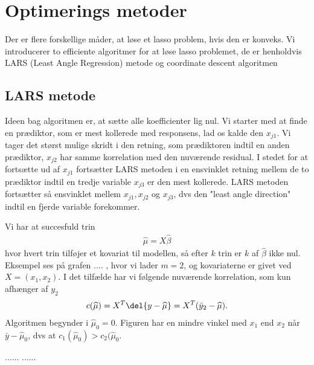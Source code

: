 \chapter{Optimerings metoder}

Der er flere forskellige måder, at løse et lasso problem, hvis den er konveks. 
Vi introducerer to efficiente algoritmer for at løse lasso problemet, de er henholdvis LARS  (Least Angle Regression) metode og coordinate descent algoritmen 

\section{LARS metode}
Ideen bag algoritmen er, at sætte alle koefficienter lig nul. 
Vi starter med at finde en prædiktor, som er mest kollerede med responsens, lad os kalde den $x_{j1}$. Vi tager det størst mulige skridt i den retning, som prædiktoren indtil en anden prædiktor, $x_{j2}$ har samme korrelation med den nuværende residual. 
I stedet for at fortsætte ud af $x_{j1}$ fortsætter LARS metoden i en ensvinklet retning mellem de to prædiktor indtil en tredje variable $x_{j3}$ er den mest kollerede. LARS metoden fortsætter så ensvinklet mellem $x_{j1}, x_{j2}$ og $ x_{j3}$, dvs den "least angle direction" indtil en fjerde variable forekommer. 

Vi har at succesfuld trin
\begin{align*}
\widehat{\mu} = X \widehat{\beta}
\end{align*}
hvor hvert trin tilføjer et kovariat til modellen, så efter $k$ trin er $k$ af $\widehat{\beta}$ ikke nul. 
Eksempel ses på grafen .... , hvor vi lader $m = 2$, og kovariaterne er givet ved $X = (x_1, x_2)$. I det tilfælde har vi følgende nuværende korrelation, som kun afhænger af $y_2$
\begin{align*}
c(\widehat{\mu}) = X^T \del{y- \widehat{\mu}} = X^T(\bar{y}_2 - \widehat{\mu} )
. 
\end{align*}
Algoritmen begynder i $\widehat{\mu}_0 = 0$. Figuren har en mindre vinkel med $x_1$ end $x_2$ når $\bar{y} - \widehat{\mu}_0$, dvs at $c_1(\widehat{\mu}_0) > c_2(\widehat{\mu}_0$.  

......
......


